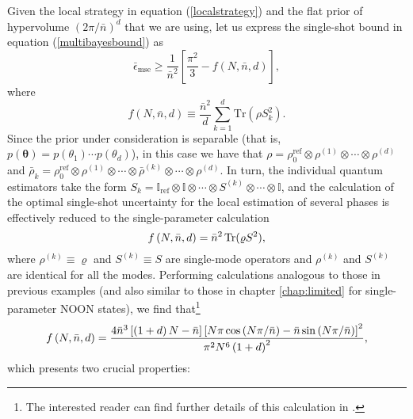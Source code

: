 Given the local strategy in equation (\ref{localstrategy}) and the flat prior of hypervolume $(2\pi/\bar{n})^d$ that we are using, let us express the single-shot bound in equation (\ref{multibayesbound}) as 
\begin{equation}
\bar{\epsilon}_{\mathrm{mse}} \geqslant  \frac{1}{\bar{n}^2} \left[\frac{\pi^2}{3} - f\left(N, \bar{n}, d\right) \right],
\end{equation}
where 
\begin{equation}
f\left(N, \bar{n}, d\right) \equiv \frac{\bar{n}^2}{d} \sum_{k=1}^d \mathrm{Tr}(\rho S_k^2). 
\end{equation}
Since the prior under consideration is separable (that is, $p(\boldsymbol{\theta})=p(\theta_1)\cdots p(\theta_d)$), in this case we have that $\rho = \rho_0^{\mathrm{ref}}\otimes \rho^{(1)}\otimes  \cdots \otimes \rho^{(d)}$ and $\bar{\rho}_k = \rho_0^{\mathrm{ref}}\otimes \rho^{(1)}\otimes  \cdots \otimes \bar{\rho}^{(k)} \otimes  \cdots \otimes \rho^{(d)}$. In turn, the individual quantum estimators take the form $S_k = \mathbb{I}_{\mathrm{ref}}\otimes\mathbb{I}\otimes \cdots \otimes S^{(k)} \otimes\cdots \otimes \mathbb{I}$, and the calculation of the optimal single-shot uncertainty for the local estimation of several phases is effectively reduced to the single-parameter calculation 
\begin{equation}
f\left(N, \bar{n}, d \right) = \bar{n}^2 \hspace{0.15em} \mathrm{Tr}(\varrho S^2),
\label{localfunction}
\end{equation}
where $\rho^{(k)} \equiv \varrho$ and $S^{(k)}\equiv S$ are single-mode operators and $\rho^{(k)}$ and $S^{(k)}$ are identical for all the modes. Performing calculations analogous to those in previous examples (and also similar to those in chapter \ref{chap:limited} for single-parameter NOON states), we find that\footnote{The interested reader can find further details of this calculation in \cite{jesus2019b}.}
\begin{equation}
f\left(N, \bar{n}, d \right) = \frac{4\bar{n}^3\left[\left(1 + d\right) N - \bar{n} \right]\left[N \pi \hspace{0.15em}\mathrm{cos}\left(N\pi/\bar{n}\right) - \bar{n}\hspace{0.15em}\mathrm{sin}\left(N\pi/\bar{n}\right) \right]^2}{\pi^2 N^6 \left(1 + d\right)^2},
\end{equation}
which presents two crucial properties:  
